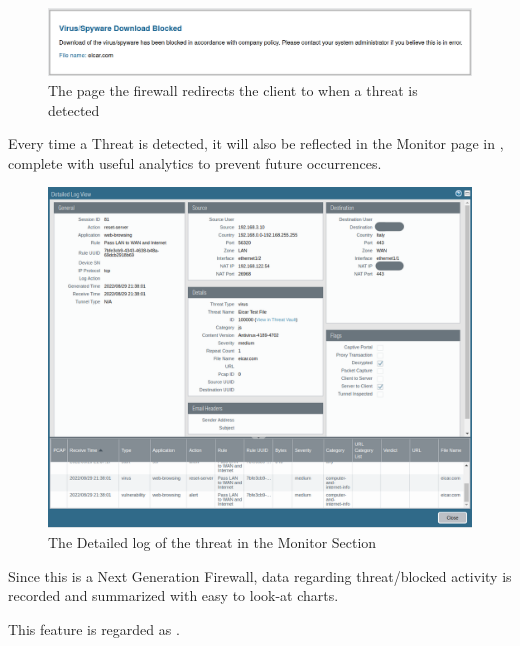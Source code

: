 \begin{figure}[h!]
 \centering
 \includegraphics[width=13.5cm]{img/virus_blocked.png}
 \caption{The page the firewall redirects the client to when a threat is detected}
 \label{fig: virus blocked}
\end{figure}

Every time a Threat is detected, it will also be reflected in the Monitor page in , complete with useful analytics to prevent future occurrences.

\begin{figure}[h!]
 \centering
 \includegraphics[width=13.5cm]{img/detailed_log.png}
 \caption{The Detailed log of the threat in the Monitor Section}
 \label{fig: detailed log}
\end{figure}

\newpage

Since this is a Next Generation Firewall, data regarding threat/blocked activity is recorded and summarized with easy to look-at charts.

This feature is regarded as .


